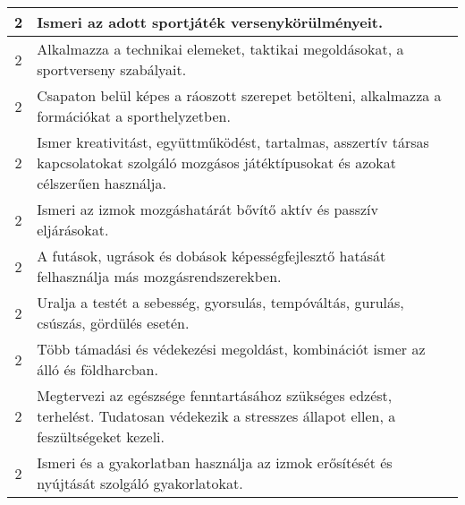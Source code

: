 \begin{longtable}{c | p{} }
                                
                                          2 &  Ismeri az adott sportjáték versenykörülményeit. \\ \hline
                                          2 &  Alkalmazza a technikai elemeket, taktikai megoldásokat, a sportverseny szabályait. \\ \hline
                                          2 &  Csapaton belül képes a ráoszott szerepet betölteni, alkalmazza a formációkat a sporthelyzetben. \\ \hline
                                          2 &  Ismer kreativitást, együttműködést, tartalmas, asszertív társas kapcsolatokat szolgáló mozgásos játéktípusokat és azokat célszerűen használja. \\ \hline
                                          2 &  Ismeri az izmok mozgáshatárát bővítő aktív és passzív eljárásokat. \\ \hline
                                          2 &  A futások, ugrások és dobások képességfejlesztő hatását felhasználja más mozgásrendszerekben. \\ \hline
                                          2 &  Uralja a testét a sebesség, gyorsulás, tempóváltás, gurulás, csúszás, gördülés esetén. \\ \hline
                                          2 &  Több támadási és védekezési megoldást, kombinációt ismer az álló és földharcban. \\ \hline
                                          2 &  Megtervezi az egészsége fenntartásához szükséges edzést, terhelést. Tudatosan védekezik a stresszes állapot ellen, a feszültségeket kezeli. \\ \hline
                                          2 &  Ismeri és a gyakorlatban használja az izmok erősítését és nyújtását szolgáló gyakorlatokat. \\ \hline
                                      

\end{longtable}
